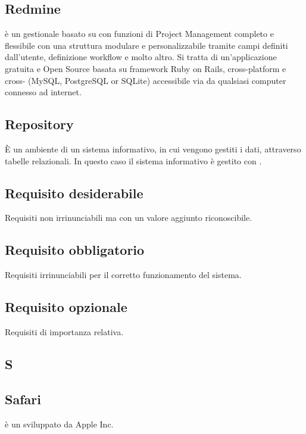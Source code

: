 \subsection*{Redmine}
 è un  gestionale basato su  con funzioni di Project Management completo e flessibile con una struttura modulare e personalizzabile tramite campi definiti dall'utente, definizione workflow e molto altro.
Si tratta di un'applicazione gratuita e Open Source basata su framework Ruby on Rails, cross-platform e cross- (MySQL, PostgreSQL or SQLite) accessibile via  da qualsiasi computer connesso ad internet.

\subsection*{Repository}
È un ambiente di un sistema informativo, in cui vengono gestiti i dati, attraverso
tabelle relazionali. In questo caso il sistema informativo è gestito con .

\subsection*{Requisito desiderabile}
Requisiti non irrinunciabili ma con un valore aggiunto riconoscibile.

\subsection*{Requisito obbligatorio}
Requisiti irrinunciabili per il corretto funzionamento del sistema.

\subsection*{Requisito opzionale}
Requisiti di importanza relativa.

\newpage

\begin{center}
\Huge\section*{\uppercase{S}}
\end{center}

\subsection*{Safari}
 è un   sviluppato da Apple Inc. 

